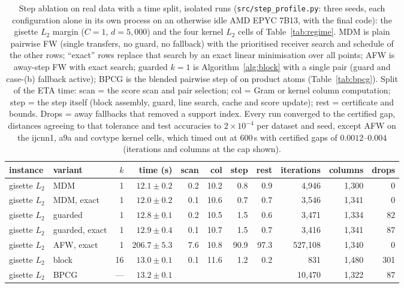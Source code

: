 \documentclass{opt2026}   %
\begin{document}
\begin{table}[h]\centering\scriptsize\setlength{\tabcolsep}{3.5pt}
\caption{Step ablation on real data with a time split, isolated runs
(\texttt{src/step\_profile.py}: three seeds, each configuration alone
in its own process on an otherwise idle AMD EPYC 7B13, with the final
code): the gisette $L_2$ margin ($C{=}1$, $d{=}5{,}000$) and the four
kernel $L_2$ cells of Table~\ref{tab:regime}. MDM is plain pairwise FW
(single transfers, no guard, no fallback) with the prioritised receiver
search and schedule of the other rows; ``exact'' rows replace that
search by an exact linear minimisation over all points; AFW is
away-step FW with exact search; guarded $k{=}1$ is
Algorithm~\ref{alg:block} with a single pair (guard and case-(b)
fallback active); BPCG is the blended pairwise step of \cite{tsuji2022}
on product atoms (Table~\ref{tab:bpcg}). Split of the ETA time: scan = the score scan and
pair selection; col = Gram or kernel column computation; step = the
step itself (block assembly, guard, line search, cache and score
update); rest = certificate and bounds. Drops = away fallbacks that
removed a support index. Every run converged to the certified gap,
distances agreeing to that tolerance and test accuracies to
$2\times10^{-4}$ per dataset and seed, except AFW on the ijcnn1, a9a and
covtype kernel cells, which timed out at $600$\,s with certified gaps of
$0.0012$--$0.004$ (iterations and columns at the cap shown).}\label{tab:kreal}
\begin{tabular}{llrrrrrrrrr}\toprule
instance & variant & $k$ & time (s) & scan & col & step & rest & iterations & columns & drops \\\midrule
gisette $L_2$ & MDM & 1 & $12.1\pm0.2$ & 0.2 & 10.2 & 0.8 & 0.9 & 4,946 & 1,300 & 0 \\
gisette $L_2$ & MDM, exact & 1 & $12.0\pm0.2$ & 0.1 & 10.6 & 0.7 & 0.7 & 3,546 & 1,341 & 0 \\
gisette $L_2$ & guarded & 1 & $12.8\pm0.1$ & 0.2 & 10.5 & 1.5 & 0.6 & 3,471 & 1,334 & 82 \\
gisette $L_2$ & guarded, exact & 1 & $12.9\pm0.4$ & 0.1 & 10.7 & 1.5 & 0.7 & 3,416 & 1,341 & 87 \\
gisette $L_2$ & AFW, exact & 1 & $206.7\pm5.3$ & 7.6 & 10.8 & 90.9 & 97.3 & 527,108 & 1,340 & 0 \\
gisette $L_2$ & block & 16 & $13.0\pm0.1$ & 0.1 & 11.6 & 1.2 & 0.2 & 831 & 1,480 & 301 \\
gisette $L_2$ & BPCG & --- & $13.2\pm0.1$ &  & & & & 10,470 & 1,322 & 87 \\

\end{tabular}
\end{table}
\end{document}
